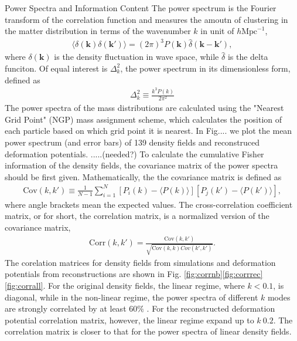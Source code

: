 \begin{section}{Power Spectra and Information Content}
  \label{sec:fisherinfo}
    The power spectrum is the Fourier transform of the correlation function and measures the amoutn of clustering in the matter distribution in terms of the wavenumber $k$ in unit of $h \mathrm{Mpc}^{-1}$,
\begin{align}
    \langle \delta \left( \bm{k} \right) \delta \left( \bm{k'}\right) \rangle =\left( 2\pi \right) ^3 P \left( \bm{k} \right) \hat{\delta} \left( \bm{k}-\bm{k'} \right),
\end{align}
where $\delta \left( \bm{k} \right)$ is the density fluctuation in wave space, while $\hat{\delta}$ is the delta funciton. Of equal interest is $\Delta ^2_k$, the power spectrum in its dimensionless form, defined as
\begin{align}
    \Delta ^2_k \equiv \frac{k^3 P \left( k \right)}{2\pi ^2}
\end{align}
    The power spectra of the mass distributions are calculated using the "Nearest Grid Point" (NGP) mass assignment scheme, which calculates the position of each particle based on which grid point it is nearest. In Fig.... we plot the mean power spectrum (and error bars) of 139 density fields and reconstruced deformation potentials. .....(needed?)
    To calculate the cumulative Fisher information of the density fields, the covariance matrix of the power spectra should be first given. Mathematically, the the covariance matrix is defined as
\begin{align}
    \mathrm{Cov}\left(k,k'\right)\equiv \frac{1}{N-1}\sum_{i=1}^{N}\left[ P_i \left( k \right) - \langle P \left( k \right) \rangle \right]\left[ P_j \left( k' \right) - \langle P \left( k' \right)\rangle \right],
\end{align}
where angle brackets mean the expected values. 
    The cross-correlation coefficient matrix, or for short, the correlation matrix, is a normalized version of the covariance matrix,
\begin{align}
    \mathrm{Corr}\left(k,k'\right)=\frac{\mathrm{Cov}\left(k,k'\right)}{\sqrt{\mathrm{Cov}\left(k,k\right)Cov\left(k',k'\right)}}.
\end{align}
The corelation matrices for density fields from simulations and deformation potentials from reconstructions are shown in Fig. \ref{fig:corrnb}\ref{fig:corrrec} \ref{fig:corrall}. For the original density fields, the linear regime, where $k<0.1$, is diagonal, while in the non-linear regime, the power spectra of different $k$ modes are strongly correlated by at least $60\%$ . For the reconstructed deformation potential correlation matrix, however, the linear regime expand up to $k~0.2$. The correlation matrix is closer to that for the power spectra of linear density fields.

\end{section}
